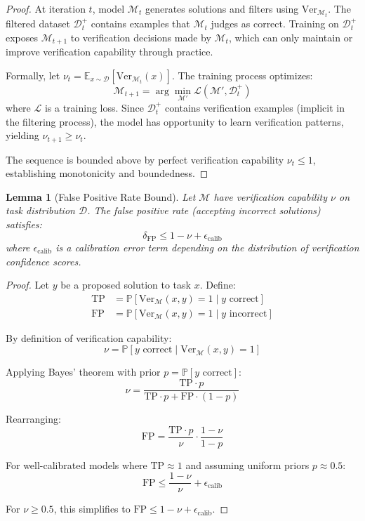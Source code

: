 \documentclass{article}
\newtheorem{lemma}[theorem]{Lemma}
\theoremstyle{definition}
\theoremstyle{remark}
\newcommand{\M}{\mathcal{M}}
\newcommand{\D}{\mathcal{D}}
\newcommand{\Ver}{\text{Ver}}
\newcommand{\E}{\mathbb{E}}
\newcommand{\Prob}{\mathbb{P}}
\begin{document}
\begin{proof}
At iteration \(t\), model \(\M_t\) generates solutions and filters using \(\Ver_{\M_t}\). The filtered dataset \(\D_t^+\) contains examples that \(\M_t\) judges as correct. Training on \(\D_t^+\) exposes \(\M_{t+1}\) to verification decisions made by \(\M_t\), which can only maintain or improve verification capability through practice.

Formally, let \(\nu_t = \E_{x \sim \D}[\Ver_{\M_t}(x)]\). The training process optimizes:
\[
\M_{t+1} = \arg\min_{\M'} \mathcal{L}(\M', \D_t^+)
\]
where \(\mathcal{L}\) is a training loss. Since \(\D_t^+\) contains verification examples (implicit in the filtering process), the model has opportunity to learn verification patterns, yielding \(\nu_{t+1} \geq \nu_t\).

The sequence is bounded above by perfect verification capability \(\nu_t \leq 1\), establishing monotonicity and boundedness.
\end{proof}

\begin{lemma}[False Positive Rate Bound]
\label{lem:false-positive}
Let \(\M\) have verification capability \(\nu\) on task distribution \(\D\). The false positive rate (accepting incorrect solutions) satisfies:
\[
\delta_{\text{FP}} \leq 1 - \nu + \epsilon_{\text{calib}}
\]
where \(\epsilon_{\text{calib}}\) is a calibration error term depending on the distribution of verification confidence scores.
\end{lemma}

\begin{proof}
Let \(y\) be a proposed solution to task \(x\). Define:
\begin{align*}
\text{TP} &= \Prob[\Ver_\M(x,y) = 1 \mid y \text{ correct}] \\
\text{FP} &= \Prob[\Ver_\M(x,y) = 1 \mid y \text{ incorrect}]
\end{align*}

By definition of verification capability:
\[
\nu = \Prob[y \text{ correct} \mid \Ver_\M(x,y) = 1]
\]

Applying Bayes' theorem with prior \(p = \Prob[y \text{ correct}]\):
\[
\nu = \frac{\text{TP} \cdot p}{\text{TP} \cdot p + \text{FP} \cdot (1-p)}
\]

Rearranging:
\[
\text{FP} = \frac{\text{TP} \cdot p}{\nu} \cdot \frac{1-\nu}{1-p}
\]

For well-calibrated models where \(\text{TP} \approx 1\) and assuming uniform priors \(p \approx 0.5\):
\[
\text{FP} \leq \frac{1-\nu}{\nu} + \epsilon_{\text{calib}}
\]

For \(\nu \geq 0.5\), this simplifies to \(\text{FP} \leq 1 - \nu + \epsilon_{\text{calib}}\).
\end{proof}
\end{document}
